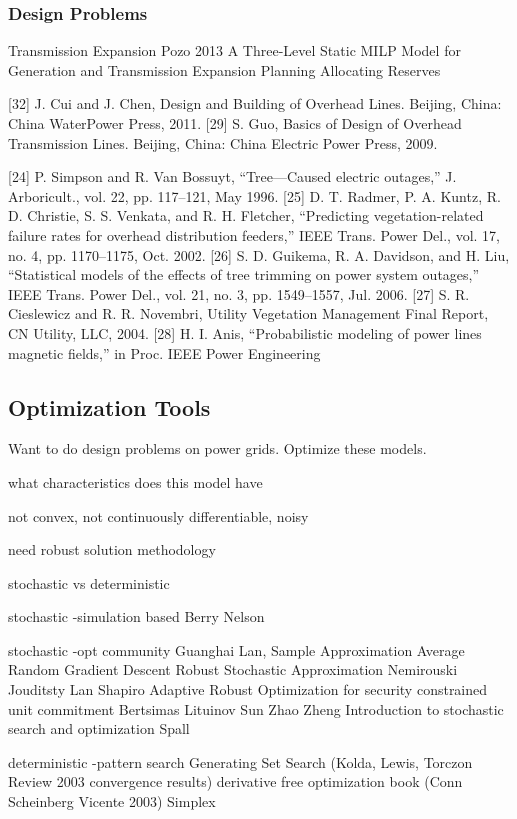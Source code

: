 \subsubsection{Design Problems}
Transmission Expansion
Pozo 2013 A Three-Level Static MILP Model for Generation and Transmission Expansion Planning
Allocating Reserves

[32] J. Cui and J. Chen, Design and Building of Overhead Lines. Beijing,
China: China WaterPower Press, 2011.
[29] S. Guo, Basics of Design of Overhead Transmission Lines. Beijing,
China: China Electric Power Press, 2009.

[24] P. Simpson and R. Van Bossuyt, “Tree—Caused electric outages,” J.
Arboricult., vol. 22, pp. 117–121, May 1996.
[25] D. T. Radmer, P. A. Kuntz, R. D. Christie, S. S. Venkata, and R.
H. Fletcher, “Predicting vegetation-related failure rates for overhead
distribution feeders,” IEEE Trans. Power Del., vol. 17, no. 4, pp.
1170–1175, Oct. 2002.
[26] S. D. Guikema, R. A. Davidson, and H. Liu, “Statistical models of the
effects of tree trimming on power system outages,” IEEE Trans. Power
Del., vol. 21, no. 3, pp. 1549–1557, Jul. 2006.
[27] S. R. Cieslewicz and R. R. Novembri, Utility Vegetation Management
Final Report, CN Utility, LLC, 2004.
[28] H. I. Anis, “Probabilistic modeling of power lines magnetic fields,” in
Proc. IEEE Power Engineering



\subsection{Optimization Tools}
Want to do design problems on power grids.  Optimize these models. 

what characteristics does this model have

not convex, not continuously differentiable, noisy 

need robust solution methodology 


stochastic vs deterministic

stochastic 
-simulation based
Berry Nelson

stochastic
-opt community
Guanghai Lan, 
Sample Approximation Average
Random Gradient Descent
Robust Stochastic Approximation Nemirouski Jouditsty Lan Shapiro
Adaptive Robust Optimization for security constrained unit commitment Bertsimas Lituinov Sun Zhao Zheng
Introduction to stochastic search and optimization Spall

deterministic
-pattern search
Generating Set Search (Kolda, Lewis, Torczon Review 2003 convergence results)
derivative free optimization book (Conn Scheinberg Vicente 2003)
Simplex

